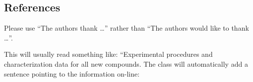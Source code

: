 \documentclass[journal=jacsat,manuscript=article]{achemso}
\begin{document}
\subsection{References}



\begin{acknowledgement}

Please use ``The authors thank \ldots'' rather than ``The
authors would like to thank \ldots''.


\end{acknowledgement}

\begin{suppinfo}

This will usually read something like: ``Experimental procedures and
characterization data for all new compounds. The class will
automatically add a sentence pointing to the information on-line:

\end{suppinfo}


\end{document}
